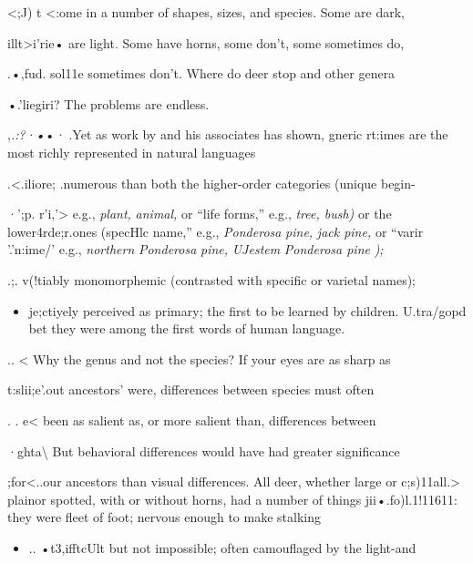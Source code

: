 {\textless};J) t {\textless}:ome in a number of shapes, sizes, and species. Some are dark,

illt{\textgreater}i'rie• are light. Some have horns, some don't, some sometimes do,

.•,fud. sol11e sometimes don't. Where do deer stop and other genera

•.'liegiri? The problems are endless.

,\textit{.}\textit{:}\textit{?}\textit{·•}•\textit{· }.Yet as work by \citet{Berlin1972} and his associates has shown, gneric rt:imes are the most richly represented in natural languages\-

.{\textless}.iliore; .numerous than both the higher-order categories ({\textquotedbl}unique begin-

·';p. r'i,'{\textgreater} e.g., \textit{plant,} \textit{animal,} or ``life forms,'' e.g., \textit{tree, bus}\textit{h}\textit{)} or the lower\-4rde;r.ones ({\textquotedbl}specHlc name,'' e.g., \textit{Ponderosa} \textit{pine,} \textit{jack pine, }or ``vari\-r '.'n:ime/' e.g., \textit{northern} \textit{Ponderosa} \textit{pine, }\textit{UJ}\textit{estem} \textit{Ponderosa pine} \textit{);}

.;. v(!tiably monomorphemic (contrasted with specific or varietal names);

\begin{itemize}
\item je;ctiyely perceived as primary; the first to be learned by children. U.tr{\textquotedbl}a/gopd bet they were among the first words of human language.
\end{itemize}

.. {\textless} Why the genus and not the species? If your eyes are as sharp as

t:slii;e'.out ancestors' were, differences between species must often

. . e{\textless} been as salient as, or more salient than, differences between

·ghta{\textbackslash} But behavioral differences would have had greater significance

;for{\textless}..our ancestors than visual differences. All deer, whether large or c;s)11all.{\textgreater} plainor spotted, with or without horns, had a number of things jii•.fo)l.1!11611: they were fleet of foot; nervous enough to make stalking

\begin{itemize}
\item .. •t3,ifftcUlt but not impossible; often camouflaged by the light-and\-
\end{itemize}

